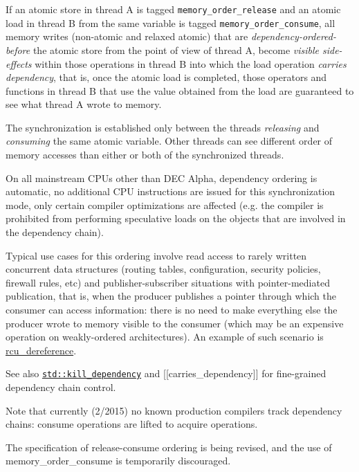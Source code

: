 \documentclass[a4paper,12pt,notitlepage,twoside,openright]{article}
\begin{document}
If an atomic store in thread A is tagged \texttt{memory\_order\_release} and an
atomic load in thread B from the same variable is tagged
\texttt{memory\_order\_consume}, all memory writes (non-atomic and relaxed
atomic) that are \emph{dependency-ordered-before} the atomic store from
the point of view of thread A, become \emph{visible side-effects} within
those operations in thread B into which the load operation \emph{carries
dependency}, that is, once the atomic load is completed, those operators
and functions in thread B that use the value obtained from the load are
guaranteed to see what thread A wrote to memory.

The synchronization is established only between the threads
\emph{releasing} and \emph{consuming} the same atomic variable. Other
threads can see different order of memory accesses than either or both
of the synchronized threads.

On all mainstream CPUs other than DEC Alpha, dependency ordering is
automatic, no additional CPU instructions are issued for this
synchronization mode, only certain compiler optimizations are affected
(e.g. the compiler is prohibited from performing speculative loads on
the objects that are involved in the dependency chain).

Typical use cases for this ordering involve read access to rarely
written concurrent data structures (routing tables, configuration,
security policies, firewall rules, etc) and publisher-subscriber
situations with pointer-mediated publication, that is, when the producer
publishes a pointer through which the consumer can access information:
there is no need to make everything else the producer wrote to memory
visible to the consumer (which may be an expensive operation on
weakly-ordered architectures). An example of such scenario is
\href{https://en.wikipedia.org/wiki/Read-copy-update}{rcu\_dereference}.

See also
\href{https://en.cppreference.com/w/cpp/atomic/kill_dependency}{\texttt{std::kill\_dependency}}
and {[}{[}carries\_dependency{]}{]} for fine-grained dependency chain
control.

Note that currently (2/2015) no known production compilers track
dependency chains: consume operations are lifted to acquire operations.

\begin{oframed}
\marginnote{\textcolor{ForestGreen}{(since C++17)}}
The specification of release-consume ordering is being revised, and the
use of memory\_order\_consume is temporarily discouraged.
\end{oframed}
\end{document}

